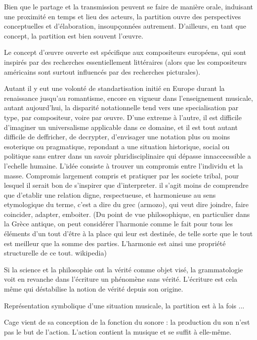 \documentclass{article}
\begin{document}
Bien que le partage et la transmission peuvent se faire de manière orale, induisant une proximité en temps et lieu des acteurs, la partition ouvre des perspectives conceptuelles et d'élaboration, insoupçonnées autrement. D'ailleurs, en tant que concept, la partition est bien souvent l'œuvre.  


Le concept d'œuvre ouverte est spécifique aux compositeurs européens, qui sont inspirés par des recherches essentiellement littéraires (alors que les compositeurs américains sont surtout influencés par des recherches picturales).

Autant il y eut une volonté de standartisation initié en Europe durant la renaissance jusqu'au romantisme, encore en vigueur dans l'enseignement musicale, autant aujourd'hui, la disparité notationnelle tend vers une  specialisation par type, par compositeur, voire par œuvre.
D'une extreme à l'autre, il est difficile d'imaginer un universalisme applicable dans ce domaine, et il est tout autant difficile de deffricher, de decrypter, d'envisager une notation plus ou moins esoterique ou pragmatique, repondant a une situation historique, social ou politique sans entrer dans un savoir pluridisciplinaire qui dépasse innaccecssible a l'echelle humaine. L'idée consiste à trouver un compromis entre l'individu et la masse. Compromis largement compris et pratiquer par les societe tribal, pour lesquel il serait bon de s'inspirer que d'interpreter. il s'agit moins de comprendre que d'etablir une relation digne, respectueuse, et harmonieuse au sens etymologique du terme, c'est a dire du grec (armozo), qui veut dire joindre, faire coincider, adapter, emboiter. (Du point de vue philosophique, en particulier dans la Grèce antique, on peut considérer l'harmonie comme le fait pour tous les éléments d'un tout d'être à la place qui leur est destinée, de telle sorte que le tout est meilleur que la somme des parties. L'harmonie est ainsi une propriété structurelle de ce tout. wikipedia)

 Si la science et la philosophie ont la vérité comme objet visé, la grammatologie
voit en revanche dans l’écriture un phénomène sans vérité. L’écriture est cela même qui
déstabilise la notion de vérité depuis son origine.

Représentation symbolique d'une situation musicale, la partition est à la fois ...

 Cage vient de sa conception de la fonction du sonore : la production du son n'est pas le but de l'action. L'action contient la musique et se suffit à elle-même.
\end{document}
